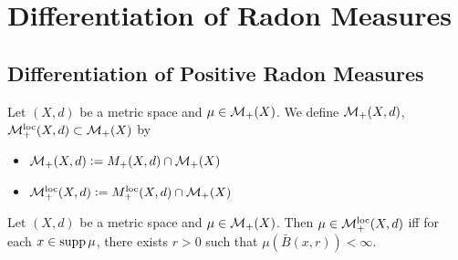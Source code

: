 \documentclass{book}
\begin{document}
	
	
	
	
	
	
	
	
	
	
	\section{Differentiation of Radon Measures}
	
	\subsection{Differentiation of Positive Radon Measures}

	\begin{defn} 
		Let $(X, d)$ be a metric space and $\mu \in \mathcal{M}_+(X)$. We define $\mathcal{M}_+(X, d)$, $\mathcal{M}_+^{\text{loc}}(X, d) \subset \mathcal{M}_+(X)$ by
		\begin{itemize} 
			\item $\mathcal{M}_+(X, d) \vcentcolon= M_+(X, d) \cap \mathcal{M}_+(X)$
			\item $\mathcal{M}_+^{\text{loc}}(X, d) \vcentcolon= M_+^{\text{loc}}(X, d) \cap \mathcal{M}_+(X)$
		\end{itemize}
	\end{defn}

	\begin{ex} 
		Let $(X, d)$ be a metric space and $\mu \in \mathcal{M}_+(X)$. Then $\mu \in \mathcal{M}_+^{\text{loc}}(X, d)$ iff for each $x \in \operatorname{supp} \mu$, there exists $r > 0$ such that $\mu(\bar{B}(x, r)) < \infty$. 
	\end{ex}
\end{document}
